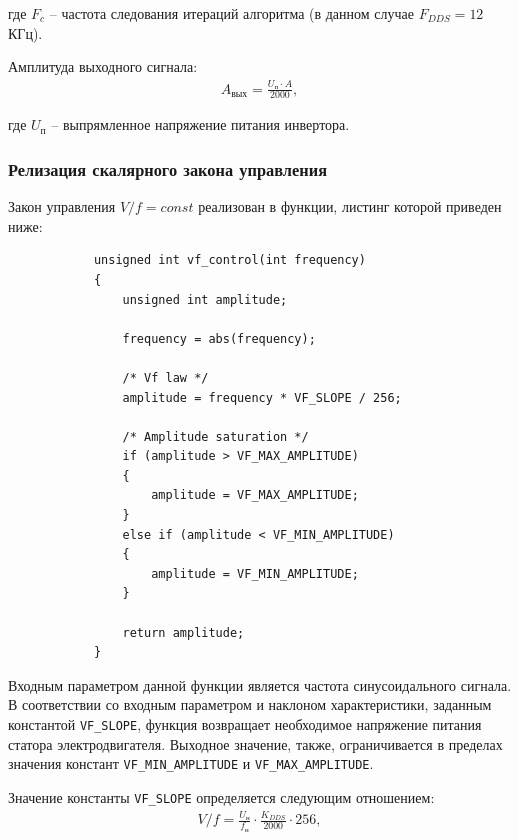         где $F_c$ -- частота следования итераций алгоритма (в данном случае $F_{DDS} = 12$ КГц).

        Амплитуда выходного сигнала:
        \begin{gather*}
            A_\text{вых} = \frac{U_\text{п} \cdot A}{2000},
        \end{gather*}

        где $U_\text{п}$ -- выпрямленное напряжение питания инвертора. 

    \subsubsection{Релизация скалярного закона управления}
        Закон управления $V/f = const$ реализован в функции, листинг которой приведен ниже:
        \begin{verbatim}
            unsigned int vf_control(int frequency)
            {
                unsigned int amplitude;

                frequency = abs(frequency);

                /* Vf law */
                amplitude = frequency * VF_SLOPE / 256;

                /* Amplitude saturation */
                if (amplitude > VF_MAX_AMPLITUDE)
                {
                    amplitude = VF_MAX_AMPLITUDE;
                } 
                else if (amplitude < VF_MIN_AMPLITUDE)
                {
                    amplitude = VF_MIN_AMPLITUDE;
                }

                return amplitude;
            }
        \end{verbatim}
        
        Входным параметром данной функции является частота синусоидального
        сигнала. В соответствии со входным параметром и наклоном
        характеристики, заданным константой \verb"VF_SLOPE", функция возвращает
        необходимое напряжение питания статора электродвигателя. Выходное
        значение, также, ограничивается в пределах значения констант
        \verb"VF_MIN_AMPLITUDE" и \verb"VF_MAX_AMPLITUDE".
        
        Значение константы \verb"VF_SLOPE" определяется следующим отношением:
        \begin{gather*}
            V/f = \frac{U_\text{н}}{f_\text{н}} \cdot \frac{K_{DDS}}{2000} \cdot 256,
        \end{gather*}

